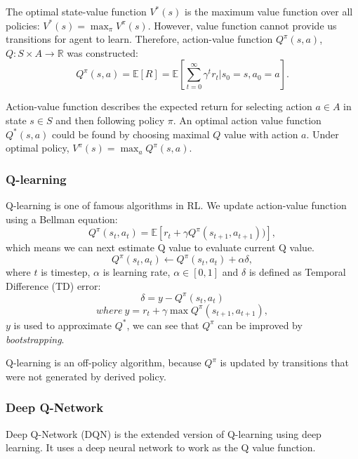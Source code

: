 \documentclass[11pt,twocolumn]{jarticle} %
\begin{document}
The optimal state-value function $V^*(s)$ is the maximum value function over all policies:
$ V^*(s) = \max_\pi V^\pi(s) $.
However, value function cannot provide us transitions for agent to learn. Therefore, action-value function $Q^\pi(s, a)$, $Q: S \times A \rightarrow \mathbb{R}$ was constructed:
\begin{equation}
Q^\pi(s, a) = \mathbb{E}[R] = \mathbb{E}[\sum_{t=0}^{\infty}\gamma^t r_t | s_0 = s, a_0 = a]. 
\end{equation}

Action-value function describes the expected return for selecting action $a \in A$ in state $s \in S$ and then following policy $\pi$. An optimal action value function $Q^*(s, a)$ could be found by choosing maximal $Q$ value with action $a$. Under optimal policy, $V^\pi(s) = \max_a{Q^\pi(s, a)}$.

\subsubsection{Q-learning\cite{qlearning}}

Q-learning is one of famous algorithms in RL. We update action-value function using a Bellman equation: 
\begin{equation}
Q^\pi(s_t, a_t) = \mathbb{E}[r_{t} + \gamma Q^\pi(s_{t+1}, a_{t+1}))],  
\end{equation}
which means we can next estimate Q value to evaluate current Q value.
\begin{equation}
Q^\pi(s_t, a_t) \leftarrow Q^\pi(s_t, a_t) + \alpha\delta,
\end{equation}
where $t$ is timestep, $\alpha$ is learning rate, $\alpha \in [0, 1]$ and $\delta$ is defined as Temporal Difference (TD) error:
\begin{equation}
\delta = y - Q^\pi(s_t, a_t)
\end{equation}
$$where \ y = r_t + \gamma\max Q^\pi(s_{t+1}, a_{t+1}),$$
$y$ is used to approximate $Q^*$, we can see that $Q^\pi$ can be improved by \textsl{bootstrapping}.\par 
Q-learning is an off-policy algorithm, because $Q^\pi$ is updated by transitions that were not generated by derived policy.

\subsubsection{Deep Q-Network\cite{dqn}}

Deep Q-Network (DQN) is the extended version of Q-learning using deep learning. It uses a deep neural network to work as the Q value function. 
\end{document}
